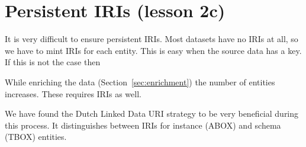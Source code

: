 \documentclass[a4paper]{scrartcl}
\begin{document}
\section{Persistent IRIs (lesson 2c)}
\label{sec:persistent_iris}

It is very difficult to ensure persistent IRIs.  Most datasets have no
IRIs at all, so we have to mint IRIs for each entity.  This is easy
when the source data has a key.  If this is not the case then 

While enriching
the data (Section~\ref{sec:enrichment}) the number of entities
increases.  These requires IRIs as well.

We have found the Dutch Linked Data URI strategy to be very beneficial
during this process.  It distinguishes between IRIs for instance
(ABOX) and schema (TBOX) entities.

\end{document}
